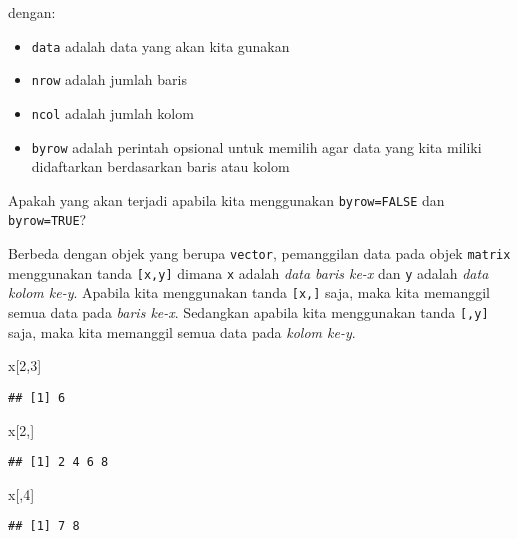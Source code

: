 \documentclass[
]{book}
\newenvironment{Shaded}{\begin{snugshade}}{\end{snugshade}}
\newcommand{\DecValTok}[1]{\textcolor[rgb]{0.00,0.00,0.81}{#1}}
\newcommand{\NormalTok}[1]{#1}
\providecommand{\tightlist}{%
  \setlength{\itemsep}{0pt}\setlength{\parskip}{0pt}}
\begin{document}
dengan:

\begin{itemize}
\tightlist
\item
  \texttt{data} adalah data yang akan kita gunakan
\item
  \texttt{nrow} adalah jumlah baris
\item
  \texttt{ncol} adalah jumlah kolom
\item
  \texttt{byrow} adalah perintah opsional untuk memilih agar data yang kita miliki didaftarkan berdasarkan baris atau kolom
\end{itemize}

Apakah yang akan terjadi apabila kita menggunakan \texttt{byrow=FALSE} dan \texttt{byrow=TRUE}?

Berbeda dengan objek yang berupa \texttt{vector}, pemanggilan data pada objek \texttt{matrix} menggunakan tanda \texttt{{[}x,y{]}} dimana \texttt{x} adalah \emph{data baris ke-x} dan \texttt{y} adalah \emph{data kolom ke-y}. Apabila kita menggunakan tanda \texttt{{[}x,{]}} saja, maka kita memanggil semua data pada \emph{baris ke-x}. Sedangkan apabila kita menggunakan tanda \texttt{{[},y{]}} saja, maka kita memanggil semua data pada \emph{kolom ke-y}.

\begin{Shaded}
\begin{Highlighting}[]
\NormalTok{x[}\DecValTok{2}\NormalTok{,}\DecValTok{3}\NormalTok{]}
\end{Highlighting}
\end{Shaded}

\begin{verbatim}
## [1] 6
\end{verbatim}

\begin{Shaded}
\begin{Highlighting}[]
\NormalTok{x[}\DecValTok{2}\NormalTok{,]}
\end{Highlighting}
\end{Shaded}

\begin{verbatim}
## [1] 2 4 6 8
\end{verbatim}

\begin{Shaded}
\begin{Highlighting}[]
\NormalTok{x[,}\DecValTok{4}\NormalTok{]}
\end{Highlighting}
\end{Shaded}

\begin{verbatim}
## [1] 7 8
\end{verbatim}
\end{document}
